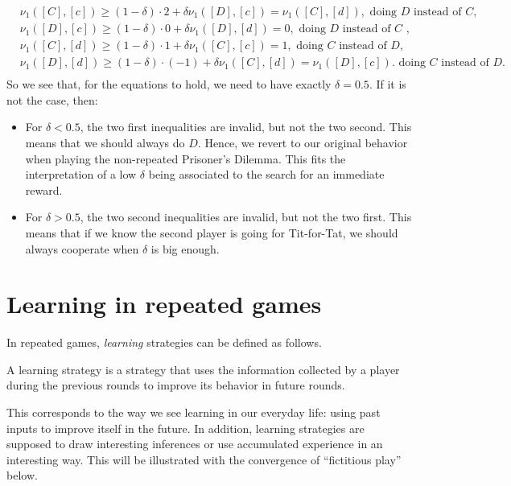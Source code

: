 \begin{example}
$$
\begin{aligned}
& \nu_1([C],[c])  \geq (1-\delta) \cdot 2 + \delta\nu_1([D],[c]) = \nu_1([C],[d]) , \text{ doing $D$ instead of $C$,}\\
& \nu_1([D],[c])  \geq (1-\delta) \cdot 0 + \delta \nu_1([D],[d]) = 0,  \text{ doing $D$ instead of $C$ , }\\
& \nu_1([C],[d])  \geq (1-\delta) \cdot 1 + \delta \nu_1([C],[c]) = 1, \text{ doing $C$ instead of $D$, } \\
& \nu_1([D],[d])  \geq (1-\delta) \cdot (-1) + \delta \nu_1([C],[d])  = \nu_1([D],[c]). \text{ doing $C$ instead of $D$. } \\
\end{aligned}
$$
So we see that, for the equations to hold, we need to have exactly $\delta = 0.5$.
If it is not the case, then:
\begin{itemize}
\item For $\delta < 0.5$, the two first inequalities are invalid, but not the two second. This means that we should always do $D$.
Hence, we revert to our original behavior when playing the non-repeated Prisoner's Dilemma. This fits the interpretation of a low $\delta$ being associated to the search for an immediate reward.
\item For $\delta > 0.5$, the two second inequalities are invalid, but not the two first.
This means that if we know the second player is going for Tit-for-Tat, we should always cooperate when $\delta$ is big enough.
\end{itemize}



\end{example}

\section{Learning in repeated games}
In repeated games, \textit{learning} strategies can be defined as follows.

\begin{definition}
    A learning strategy is a strategy that uses the information collected by a
    player during the previous rounds to improve its behavior in future rounds.
\end{definition}

This corresponds to the way we see learning in our everyday life: using
past inputs to improve itself in the future.
In addition, learning strategies are supposed to draw interesting inferences
or use accumulated experience in an interesting way. This will be illustrated
with the convergence of ``fictitious play'' below.

